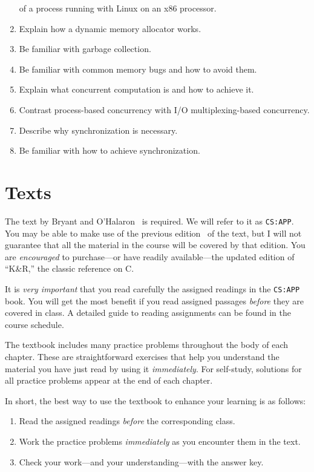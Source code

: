 \documentclass{article}
\begin{document}
\begin{enumerate}
of a process running with Linux on an x86 processor.
\item Explain how a dynamic memory allocator works.
\item Be familiar with garbage collection.
\item Be familiar with common memory bugs and how to avoid them.
\item Explain what concurrent computation is and how to achieve it.
\item Contrast process-based concurrency with I/O multiplexing-based concurrency.
\item Describe why synchronization is necessary.
\item Be familiar with how to achieve synchronization.
\end{enumerate}

\section{Texts}
\label{sec:orgheadline5}
The text by Bryant and O'Halaron~\cite{cs:app3} is required.
We will refer to it as \texttt{CS:APP}.
You may be able to make use of the previous edition~\cite{cs:app2} of the text,
but I will not guarantee that all the material in the course will be
covered by that edition.
You are \emph{encouraged} to purchase---or have readily available---the
updated edition of ``K\&R,'' the classic reference on C.\cite{k&r}

It is \emph{very important} that you read carefully
the assigned readings in the \texttt{CS:APP} book.
You will get the most benefit if you read assigned passages
\emph{before} they are covered in class.
A detailed guide to reading assignments can be found in the course schedule.

The textbook includes many practice problems throughout the body of each chapter. These
are straightforward exercises that help you understand the material you have just read by
using it \emph{immediately}. For self-study, solutions for all practice problems appear at the
end of each chapter.

In short, the best way to use the textbook to enhance your learning is as follows:
\begin{enumerate}
\item Read the assigned readings \emph{before} the corresponding class.
\item Work the practice problems \emph{immediately} as you encounter them in the text.
\item Check your work—and your understanding—with the answer key.
\end{enumerate}
\end{document}
